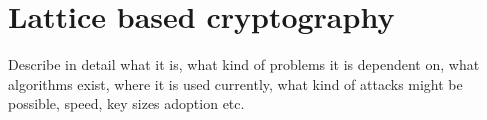 \chapter{Lattice based cryptography}

Describe in detail what it is, what kind of problems it is dependent on, what algorithms exist, where it is used currently, what kind of attacks might be possible, speed, key sizes adoption etc.
